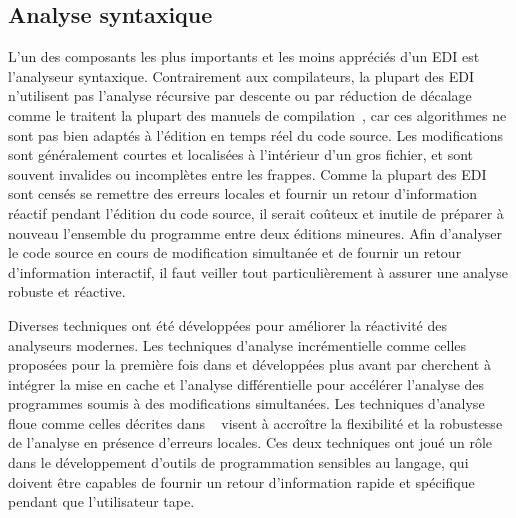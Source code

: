 {\subsection{Analyse syntaxique}\label{subsec:the-parser}

L'un des composants les plus importants et les moins appréciés d'un EDI est l'analyseur syntaxique. Contrairement aux compilateurs, la plupart des EDI n'utilisent pas l'analyse récursive par descente ou par réduction de décalage comme le traitent la plupart des manuels de compilation~\citep{appel2003modern}, car ces algorithmes ne sont pas bien adaptés à l'édition en temps réel du code source. Les modifications sont généralement courtes et localisées à l'intérieur d'un gros fichier, et sont souvent invalides ou incomplètes entre les frappes. Comme la plupart des EDI sont censés se remettre des erreurs locales et fournir un retour d'information réactif pendant l'édition du code source, il serait coûteux et inutile de préparer à nouveau l'ensemble du programme entre deux éditions mineures. Afin d'analyser le code source en cours de modification simultanée et de fournir un retour d'information interactif, il faut veiller tout particulièrement à assurer une analyse robuste et réactive.

Diverses techniques ont été développées pour améliorer la réactivité des analyseurs modernes. Les techniques d'analyse incrémentielle comme celles proposées pour la première fois dans \citet{ghezzi1979incremental} et développées plus avant par \citet{wagner1997practical,wagner1997incremental} cherchent à intégrer la mise en cache et l'analyse différentielle pour accélérer l'analyse des programmes soumis à des modifications simultanées. Les techniques d'analyse floue comme celles décrites dans ~\citet{koppler1997systematic} visent à accroître la flexibilité et la robustesse de l'analyse en présence d'erreurs locales. Ces deux techniques ont joué un rôle dans le développement d'outils de programmation sensibles au langage, qui doivent être capables de fournir un retour d'information rapide et spécifique pendant que l'utilisateur tape.

}

